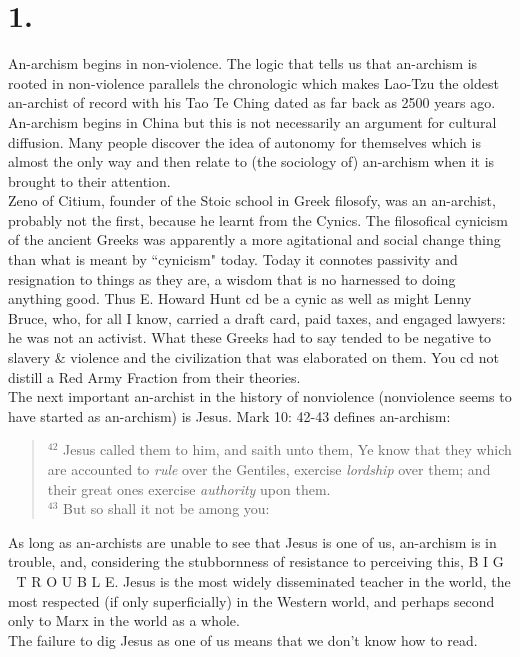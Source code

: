 \documentclass[12pt, onecolumn, letterpaper, oneside]{book}
\begin{document}
\section*{1.}
An-archism begins in non-violence. The logic that tells us that an-archism is rooted in non-violence parallels the chronologic which makes Lao-Tzu the oldest an-archist of record with his Tao Te Ching dated as far back as 2500 years ago. An-archism begins in China but this is not necessarily an argument for cultural diffusion. Many people discover the idea of autonomy for themselves which is almost the only way and then relate to (the sociology of) an-archism when it is brought to their attention.\\
Zeno of Citium, founder of the Stoic school in Greek filosofy, was an an-archist, probably not the first, because he learnt from the Cynics. The filosofical cynicism of the ancient Greeks was apparently a more agitational and social change thing than what is meant by ``cynicism" today. Today it connotes passivity and resignation to things as they are, a wisdom that is no harnessed to doing anything good. Thus E. Howard Hunt cd be a cynic as well as might Lenny Bruce, who, for all I know, carried a draft card, paid taxes, and engaged lawyers: he was not an activist. What these Greeks had to say tended to be negative to slavery \& violence and the civilization that was elaborated on them. You cd not distill a Red Army Fraction from their theories.\\
The next important an-archist in the history of nonviolence (nonviolence seems to have started as an-archism) is Jesus. Mark 10: 42-43 defines an-archism:
\blockquote{$^{42}$ Jesus called them to him, and saith unto them, Ye know that they which are accounted to \emph{rule} over the Gentiles, exercise \emph{lordship} over them; and their great ones exercise \emph{authority} upon them.\\
$^{43}$ But so shall it not be among you:}
As long as an-archists are unable to see that Jesus is one of us, an-archism is in trouble, and, considering the stubbornness of resistance to perceiving this, B I G $\;$ T R O U B L E. Jesus is the most widely disseminated teacher in the world, the most respected (if only superficially) in the Western world, and perhaps second only to Marx in the world as a whole.\\
The failure to dig Jesus as one of us means that we don't know how to read.\\
\end{document}
